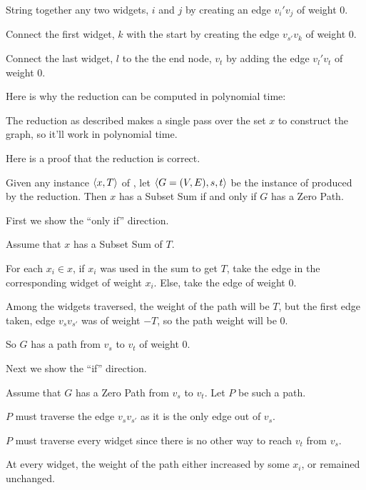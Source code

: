 \documentclass[11pt]{article}
\begin{document}
\begin{problems}
  String together any two widgets, $i$ and $j$ by creating an edge $v_i'v_j$ of weight 0.

  Connect the first widget, $k$ with the start by creating the edge $v_{s'}v_k$ of weight 0.

  Connect the last widget, $l$ to the the end node, $v_t$ by adding the edge $v_l'v_t$ of weight 0.
  \lineacross 

  \medskip 
  Here is why the reduction can be computed in polynomial time:

  \lineacross 
  The reduction as described makes a single pass over the set $x$ to construct the graph, so it'll work in polynomial time.
  \lineacross 

  \medskip 
  Here is a proof that the reduction is correct.
  \begin{lemma}
    Given any instance $\langle x, T \rangle$ of ,
    let $\langle G=(V,E), s, t \rangle$ be the instance of  produced by the reduction.
    Then $x$ has a Subset Sum
    if and only if $G$ has a Zero Path.
  \end{lemma}
  \begin{longFormProof}
    \step First we show the ``only if'' direction.
    \begin{block}[2oi]
      {Assume that $x$ has a Subset Sum of $T$.}
      \smallskip 
      
      \step For each $x_i \in x$, if $x_i$ was used in the sum to get $T$, take the edge in the corresponding widget of weight $x_i$. 
              Else, take the edge of weight 0.

      \step Among the widgets traversed, the weight of the path will be $T$, but the first edge taken, 
              edge $v_sv_{s'}$ was of weight $-T$, so the path weight will be 0.

      \step So $G$ has a path from $v_s$ to $v_t$ of weight 0.

      \smallskip 
    \end{block} 
    \step Next we show the ``if'' direction.
    \begin{block}[2i]
      {Assume that $G$ has a Zero Path from $v_s$ to $v_t$.}
      \step Let $P$ be such a path.
      \smallskip 

      \step $P$ must traverse the edge $v_sv_{s'}$ as it is the only edge out of $v_s$.

      \step $P$ must traverse every widget since there is no other way to reach $v_t$ from $v_s$.

      \step At every widget, the weight of the path either increased by some $x_i$, or remained unchanged.


\end{block}
\end{longFormProof}
\end{problems}
\end{document}
